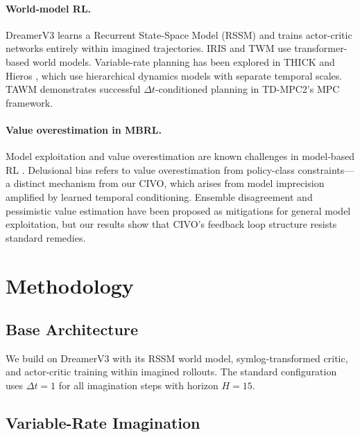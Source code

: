 \documentclass[letterpaper]{article}
\newcommand{\civo}{CIVO\xspace}
\begin{document}
\paragraph{World-model RL.}
DreamerV3 \citep{hafner2023dreamerv3} learns a Recurrent State-Space Model (RSSM) and trains actor-critic networks entirely within imagined trajectories. IRIS \citep{micheli2023iris} and TWM \citep{robine2023twm} use transformer-based world models. Variable-rate planning has been explored in THICK \citep{kim2024thick} and Hieros \citep{ropke2024hieros}, which use hierarchical dynamics models with separate temporal scales. TAWM \citep{nhu2025tawm} demonstrates successful $\Delta t$-conditioned planning in TD-MPC2's MPC framework.

\paragraph{Value overestimation in MBRL.}
Model exploitation and value overestimation are known challenges in model-based RL \citep{janner2019mbpo}. Delusional bias \citep{lu2018delusional} refers to value overestimation from policy-class constraints---a distinct mechanism from our \civo, which arises from model imprecision amplified by learned temporal conditioning. Ensemble disagreement and pessimistic value estimation have been proposed as mitigations for general model exploitation, but our results show that \civo's feedback loop structure resists standard remedies.

\section{Methodology}

\subsection{Base Architecture}

We build on DreamerV3 \citep{hafner2023dreamerv3} with its RSSM world model, symlog-transformed critic, and actor-critic training within imagined rollouts. The standard configuration uses $\Delta t=1$ for all imagination steps with horizon $H=15$.

\subsection{Variable-Rate Imagination}
\end{document}
